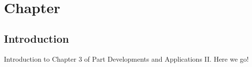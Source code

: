 \chapter{Chapter}
\label{sect:devs02_chapter3}

\section{Introduction}
\label{sect::devs02_chapter3_intro}

Introduction to Chapter 3 of Part Developments and Applications II. Here we go!